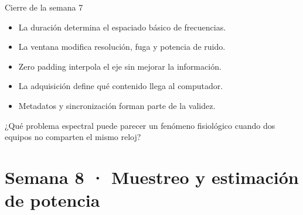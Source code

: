 \documentclass[
  ignorenonframetext,
  aspectratio=169,
  spanish,
]{beamer}
\providecommand{\tightlist}{%
  \setlength{\itemsep}{0pt}\setlength{\parskip}{0pt}}
\begin{document}
\begin{frame}{Cierre de la semana 7}
  \protect{}\label{cierre-de-la-semana-7}
  \begin{itemize}
    \tightlist
    \item
          La duración determina el espaciado básico de frecuencias.
    \item
          La ventana modifica resolución, fuga y potencia de ruido.
    \item
          Zero padding interpola el eje sin mejorar la información.
    \item
          La adquisición define qué contenido llega al computador.
    \item
          Metadatos y sincronización forman parte de la validez.
  \end{itemize}

  \begin{tcolorbox}[enhanced jigsaw, arc=.35mm, bottomrule=.15mm, bottomtitle=1mm, breakable, colback=white, colbacktitle=quarto-callout-note-color!10!white, colframe=quarto-callout-note-color-frame, coltitle=black, left=2mm, leftrule=.75mm, opacityback=0, opacitybacktitle=0.6, rightrule=.15mm, title=\textcolor{quarto-callout-note-color}{\faInfo}\hspace{0.5em}{Pregunta de salida}, titlerule=0mm, toprule=.15mm, toptitle=1mm]

    ¿Qué problema espectral puede parecer un fenómeno fisiológico cuando dos
    equipos no comparten el mismo reloj?

  \end{tcolorbox}
\end{frame}

\section{Semana 8 · Muestreo y estimación de
  potencia}\label{semana-8-muestreo-y-estimaciuxf3n-de-potencia}
\end{document}
